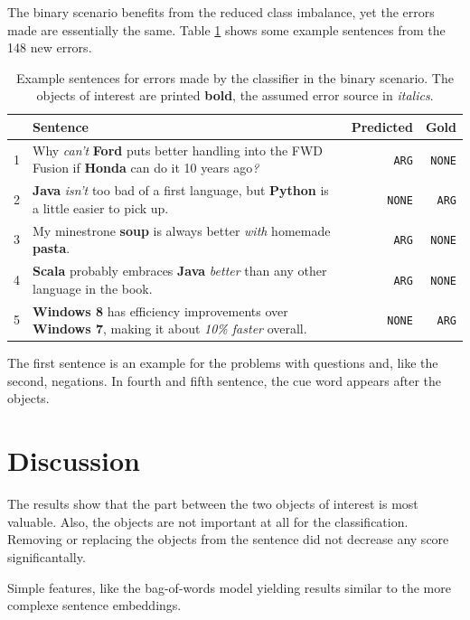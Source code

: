 The binary scenario benefits from the reduced class imbalance, yet the errors made are essentially the same. Table \ref{tbl:2_mistakes} shows some example sentences from the 148 new errors.

\begin{table}[h]
\caption{Example sentences for errors made by the classifier in the binary scenario. The objects of interest are printed \textbf{bold}, the assumed error source in \emph{italics}.}
\label{tbl:2_mistakes}
\begin{tabularx}{\linewidth}{lXrr}
\toprule
 & Sentence & Predicted & Gold \\ \midrule
1 & Why \emph{can't} \textbf{Ford} puts better handling into the FWD Fusion if \textbf{Honda} can do it 10 years ago\emph{?} & \texttt{ARG} & \texttt{NONE}\\
2 & \textbf{Java} \emph{isn't} too bad of a first language, but \textbf{Python} is a little easier to pick up. & \texttt{NONE} & \texttt{ARG} \\
3 & My minestrone \textbf{soup} is always better \emph{with} homemade \textbf{pasta}. & \texttt{ARG} & \texttt{NONE} \\
4 & \textbf{Scala} probably embraces \textbf{Java} \emph{better} than any other language in the book. & \texttt{ARG} & \texttt{NONE} \\
5 & \textbf{Windows 8} has efficiency improvements over \textbf{Windows 7}, making it about \emph{10\% faster} overall. & \texttt{NONE} & \texttt{ARG} \\
\bottomrule
\end{tabularx}

\end{table}

The first sentence is an example for the problems with questions and, like the second, negations. In fourth and fifth sentence, the cue word appears after the objects.

\section{Discussion}
The results show that the part between the two objects of interest is most valuable. Also, the objects are not important at all for the classification. Removing or replacing the objects from the sentence did not decrease any score significantally.

Simple features, like the bag-of-words model yielding results similar to the more complexe sentence embeddings.


